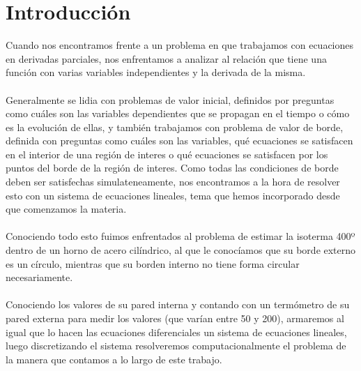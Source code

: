 \section{Introducción}

Cuando nos encontramos frente a un problema en que trabajamos con ecuaciones en derivadas parciales, nos enfrentamos a analizar al relación que tiene una función con varias variables independientes y la derivada de la misma.
\\ \\ Generalmente se lidia con problemas de valor inicial, definidos por preguntas como cuáles son las variables dependientes que se propagan en el tiempo o cómo es la evolución de ellas, y también trabajamos con problema de valor de borde, definida con preguntas como cuáles son las variables, qué ecuaciones se satisfacen en el interior de una región de interes o qué ecuaciones se satisfacen por los puntos del borde de la región de interes.
Como todas las condiciones de borde deben ser satisfechas simulateneamente, nos encontramos a la hora de resolver esto con un sistema de ecuaciones lineales, tema que hemos incorporado desde que comenzamos la materia.
\\ \\Conociendo todo esto fuimos enfrentados al problema de estimar la isoterma 400º dentro de un horno de acero cilíndrico, al que le conocíamos que su borde externo es un círculo, mientras que su borden interno no tiene forma circular necesariamente.  
\\ \\Conociendo los valores de su pared interna y contando con un termómetro de su pared externa para medir los valores (que varían entre 50 y 200), armaremos al igual que lo hacen las ecuaciones diferenciales un sistema de ecuaciones lineales, luego discretizando el sistema resolveremos computacionalmente el problema de la manera que contamos a lo largo de este trabajo.